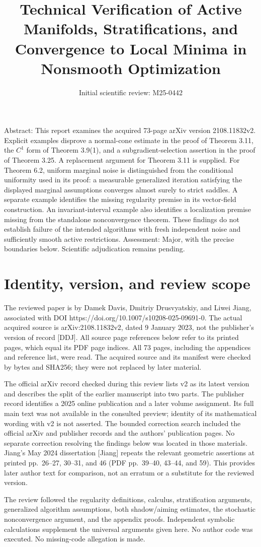 \documentclass[10pt]{article}
\title{Technical Verification of
Active Manifolds, Stratifications, and Convergence to Local Minima in Nonsmooth Optimization}
\author{Initial scientific review: M25-0442}
\date{}
\begin{document}
\maketitle
Abstract: This report examines the acquired 73-page arXiv version 2108.11832v2. Explicit examples disprove a normal-cone estimate in the proof of Theorem 3.11, the \(C^1\) form of Theorem 3.9(1), and a subgradient-selection assertion in the proof of Theorem 3.25. A replacement argument for Theorem 3.11 is supplied. For Theorem 6.2, uniform marginal noise is distinguished from the conditional uniformity used in its proof: a measurable generalized iteration satisfying the displayed marginal assumptions converges almost surely to strict saddles. A separate example identifies the missing regularity premise in its vector-field construction. An invariant-interval example also identifies a localization premise missing from the standalone nonconvergence theorem. These findings do not establish failure of the intended algorithms with fresh independent noise and sufficiently smooth active restrictions. Assessment: Major, with the precise boundaries below. Scientific adjudication remains pending.\par
\section*{Identity, version, and review scope}
The reviewed paper is by Damek Davis, Dmitriy Drusvyatskiy, and Liwei Jiang, associated with DOI https://doi.org/10.1007/s10208-025-09691-0. The actual acquired source is arXiv:2108.11832v2, dated 9 January 2023, not the publisher’s version of record [DDJ]. All source page references below refer to its printed pages, which equal its PDF page indices. All 73 pages, including the appendices and reference list, were read. The acquired source and its manifest were checked by bytes and SHA256; they were not replaced by later material.\par
The official arXiv record checked during this review lists v2 as its latest version and describes the split of the earlier manuscript into two parts. The publisher record identifies a 2025 online publication and a later volume assignment. Its full main text was not available in the consulted preview; identity of its mathematical wording with v2 is not asserted. The bounded correction search included the official arXiv and publisher records and the authors’ publication pages. No separate correction resolving the findings below was located in those materials. Jiang’s May 2024 dissertation [Jiang] repeats the relevant geometric assertions at printed pp. 26–27, 30–31, and 46 (PDF pp. 39–40, 43–44, and 59). This provides later author text for comparison, not an erratum or a substitute for the reviewed version.\par
The review followed the regularity definitions, calculus, stratification arguments, generalized algorithm assumptions, both shadow/aiming estimates, the stochastic nonconvergence argument, and the appendix proofs. Independent symbolic calculations supplement the universal arguments given here. No author code was executed. No missing-code allegation is made.\par
\end{document}
